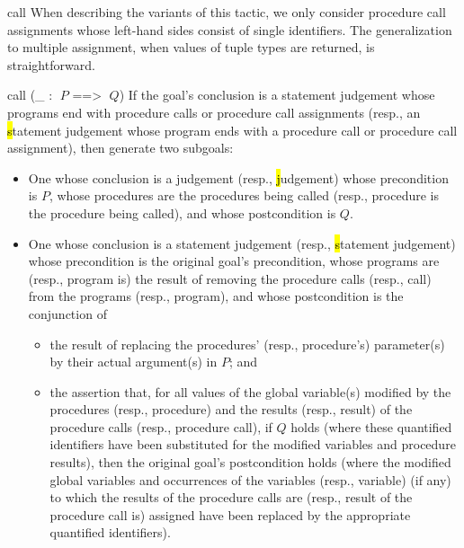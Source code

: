 \begin{tactic}{call}
  When describing the variants of this tactic, we only consider
  procedure call assignments whose left-hand sides consist of single
  identifiers.  The generalization to multiple assignment, when values
  of tuple types are returned, is straightforward.

  \bigskip
  \begin{tsyntax}{call (_ : $\;P$ ==> $\;Q$)}
    If the goal's conclusion is a \prhl statement judgement whose
    programs end with procedure calls or procedure call assignments
    (resp., an \hl statement judgement whose program ends with a
    procedure call or procedure call assignment), then generate two
    subgoals:
  \begin{itemize}
  \item One whose conclusion is a \prhl judgement (resp., \hl
    judgement) whose precondition is $P$, whose procedures are the
    procedures being called (resp., procedure is the procedure being
    called), and whose postcondition is $Q$.

  \item One whose conclusion is a \prhl statement judgement (resp.,
    \hl statement judgement) whose precondition is the original goal's
    precondition, whose programs are (resp., program is) the result of
    removing the procedure calls (resp., call) from the programs
    (resp., program), and whose postcondition is the conjunction of
    \begin{itemize}
    \item the result of replacing the procedures' (resp., procedure's)
      parameter(s) by their actual argument(s) in $P$; and

    \item the assertion that, for all values of the global variable(s)
      modified by the procedures (resp., procedure) and the results
      (resp., result) of the procedure calls (resp., procedure call),
      if $Q$ holds (where these quantified identifiers have been
      substituted for the modified variables and procedure results),
      then the original goal's postcondition holds (where the modified
      global variables and occurrences of the variables (resp.,
      variable) (if any) to which the results of the procedure calls
      are (resp., result of the procedure call is) assigned have been
      replaced by the appropriate quantified identifiers).
    \end{itemize}
  \end{itemize}


\end{tsyntax}
\end{tactic}
